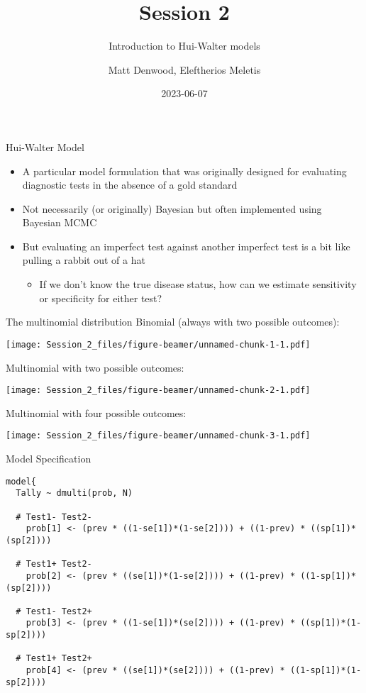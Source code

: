\documentclass[
  ignorenonframetext,
  aspectratio=169,
]{beamer}
\title{Session 2}
\subtitle{Introduction to Hui-Walter models}
\author{Matt Denwood, Eleftherios Meletis}
\date{2023-06-07}
\providecommand{\tightlist}{%
  \setlength{\itemsep}{0pt}\setlength{\parskip}{0pt}}
\begin{document}
\frame{\titlepage}

\begin{frame}{Hui-Walter Model}
\protect\hypertarget{hui-walter-model}{}
\begin{itemize}
\item
  A particular model formulation that was originally designed for
  evaluating diagnostic tests in the absence of a gold standard
\item
  Not necessarily (or originally) Bayesian but often implemented using
  Bayesian MCMC
\item
  But evaluating an imperfect test against another imperfect test is a
  bit like pulling a rabbit out of a hat

  \begin{itemize}
  \tightlist
  \item
    If we don't know the true disease status, how can we estimate
    sensitivity or specificity for either test?
  \end{itemize}
\end{itemize}
\end{frame}

\begin{frame}{The multinomial distribution}
\protect\hypertarget{the-multinomial-distribution}{}
Binomial (always with two possible outcomes):

\scriptsize\texttt{[image: Session\_2\_files/figure-beamer/unnamed-chunk-1-1.pdf]}
\normalsize
\end{frame}

\begin{frame}
Multinomial with two possible outcomes:

\scriptsize\texttt{[image: Session\_2\_files/figure-beamer/unnamed-chunk-2-1.pdf]}
\normalsize
\end{frame}

\begin{frame}
Multinomial with four possible outcomes:

\scriptsize\texttt{[image: Session\_2\_files/figure-beamer/unnamed-chunk-3-1.pdf]}
\normalsize
\end{frame}

\begin{frame}[fragile]{Model Specification}
\protect\hypertarget{model-specification}{}
\scriptsize

\begin{verbatim}
model{
  Tally ~ dmulti(prob, N)
  
  # Test1- Test2-
    prob[1] <- (prev * ((1-se[1])*(1-se[2]))) + ((1-prev) * ((sp[1])*(sp[2])))

  # Test1+ Test2-
    prob[2] <- (prev * ((se[1])*(1-se[2]))) + ((1-prev) * ((1-sp[1])*(sp[2])))

  # Test1- Test2+
    prob[3] <- (prev * ((1-se[1])*(se[2]))) + ((1-prev) * ((sp[1])*(1-sp[2])))
  
  # Test1+ Test2+
    prob[4] <- (prev * ((se[1])*(se[2]))) + ((1-prev) * ((1-sp[1])*(1-sp[2])))
\end{verbatim}

\normalsize
\end{frame}
\end{document}
